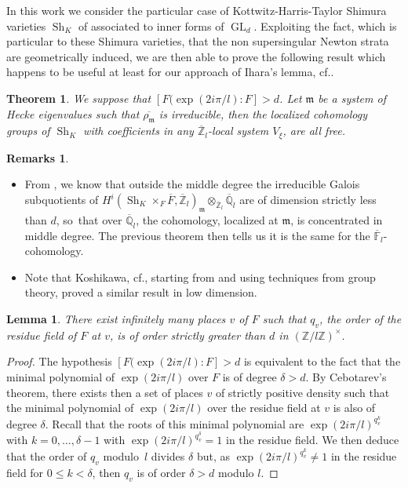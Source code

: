 \documentclass[11pt]{article}
\newcommand{\cf}{cf.\xspace}
\newcommand{\skpt}{\smallskip}
\DeclareMathOperator{\GL}{GL}
\theoremstyle{plain}
\newtheorem*{thm*}{Theorem}
\newtheorem*{lem*}{Lemma}
\theoremstyle{definition}
\newtheorem*{remarks}{Remarks}
\numberwithin{equation}{subsection}
\newcommand\Fm{{\mathbb F}}
\newcommand\Qm{{\mathbb Q}}
\newcommand\Zm{{\mathbb Z}}
\DeclareMathOperator{\sh}{Sh}
\begin{document}
In this work we consider the particular case of Kottwitz-Harris-Taylor Shimura varieties $\sh_K$
of \cite{h-t} associated to inner forms of $\GL_d$. Exploiting the fact, which is particular to these Shimura
varieties, that the non supersingular Newton strata are geometrically induced, we are then able to
prove the following result which happens to be useful at least for our approach of
Ihara's lemma, \cf \cite{boyer-ihara}.

\begin{thm*}
We suppose that $[F(\exp(2i\pi/l):F]>d$.
Let $\mathfrak m$ be a system of Hecke eigenvalues
such that $\overline{\rho_{\mathfrak m}}$
is irreducible, then the localized cohomology groups of $\sh_K$ with coefficients in any
$\overline \Zm_l$-local system $V_\xi$, are all free.
\end{thm*}

\skpt
\begin{remarks}
\begin{itemize}
\item
From \cite[\S4]{boyer-compositio}, we know that outside
the middle degree the irreducible Galois subquotients of
$H^i(\sh_K \times_F \overline F,\overline \Zm_l)_{\mathfrak m} \otimes_{\overline \Zm_l} \overline \Qm_l$ are of dimension strictly less than $d$, so~that
over $\overline \Qm_l$, the cohomology, localized at $\mathfrak m$,
is concentrated in middle degree. The previous theorem then tells us
it is the same for the $\overline \Fm_l$-cohomology.

\item
Note that Koshikawa, \cf \cite{koshikawa}, starting from \cite{boyer-imj} and using techniques from group theory, proved a similar result in low dimension.
\end{itemize}
\end{remarks}

\begin{lem*}
There exist infinitely many places $v$ of $F$ such that $q_v$, the order of the residue field of $F$ at $v$,
is of order strictly greater than $d$ in $(\Zm/l\Zm)^\times$.
\end{lem*}

\begin{proof}
The hypothesis $[F(\exp(2i\pi/l):F]>d$ is equivalent to the fact that the minimal polynomial
of $\exp(2i\pi/l)$ over $F$ is of degree $\delta> d$. By Cebotarev's
theorem, there exists then a set of places $v$ of strictly positive density such that the minimal polynomial of $\exp(2i\pi/l)$ over the residue field at $v$
is also of degree $\delta$. Recall that the roots
of this minimal polynomial are $\exp(2i\pi/l)^{q_v^k}$ with $k=0,\dots,
\delta-1$ with $\exp(2i\pi/l)^{q_v^{\delta}} =1$ in the residue field.
We then deduce that the order of $q_v$ modulo~$l$ divides $\delta$ but,
as $\exp(2i\pi/l)^{q_v^k} \neq 1$ in the residue field for $0 \leq k < \delta$,
then $q_v$ is of order $\delta > d$ modulo $l$.
\end{proof}
\end{document}
